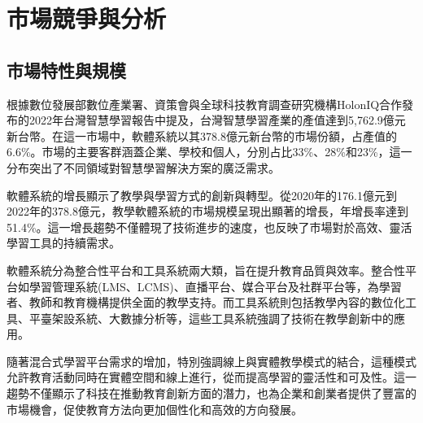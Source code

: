 \section{市場競爭與分析}

\subsection{市場特性與規模}

根據數位發展部數位產業署、資策會與全球科技教育調查研究機構HolonIQ合作發布的2022年台灣智慧學習報告中提及，台灣智慧學習產業的產值達到5,762.9億元新台幣。在這一市場中，軟體系統以其378.8億元新台幣的市場份額，占產值的6.6\%。市場的主要客群涵蓋企業、學校和個人，分別占比33\%、28\%和23\%，這一分布突出了不同領域對智慧學習解決方案的廣泛需求。

軟體系統的增長顯示了教學與學習方式的創新與轉型。從2020年的176.1億元到2022年的378.8億元，教學軟體系統的市場規模呈現出顯著的增長，年增長率達到51.4\%。這一增長趨勢不僅體現了技術進步的速度，也反映了市場對於高效、靈活學習工具的持續需求。

軟體系統分為整合性平台和工具系統兩大類，旨在提升教育品質與效率。整合性平台如學習管理系統(LMS、LCMS)、直播平台、媒合平台及社群平台等，為學習者、教師和教育機構提供全面的教學支持。而工具系統則包括教學內容的數位化工具、平臺架設系統、大數據分析等，這些工具系統強調了技術在教學創新中的應用。

隨著混合式學習平台需求的增加，特別強調線上與實體教學模式的結合，這種模式允許教育活動同時在實體空間和線上進行，從而提高學習的靈活性和可及性。這一趨勢不僅顯示了科技在推動教育創新方面的潛力，也為企業和創業者提供了豐富的市場機會，促使教育方法向更加個性化和高效的方向發展。

